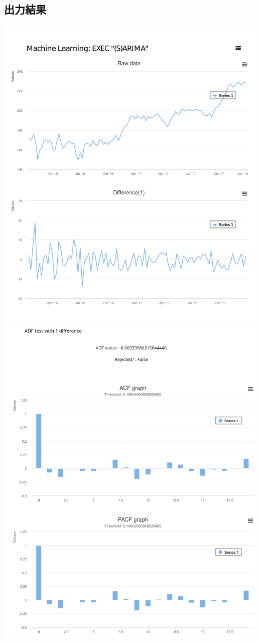 \documentclass{scrartcl}
\begin{document}
\subsection{出力結果}
\label{sec:org1842473}
\includegraphics [width=16cm] {./rect4145.png}
\newpage
\includegraphics [width=16cm] {./rect1607.png}
\end{document}
